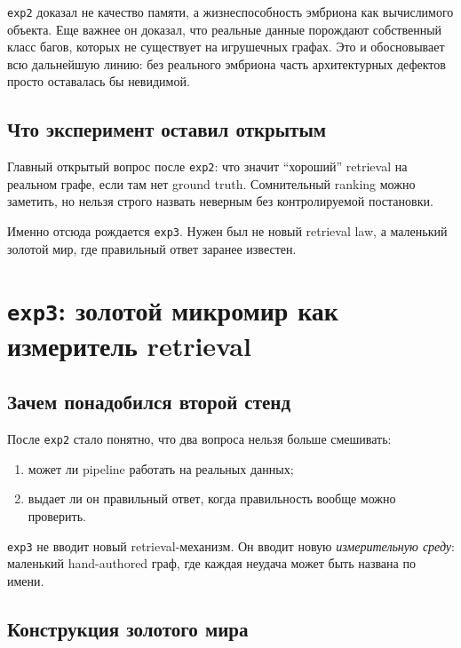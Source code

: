\begin{takeaway}
\texttt{exp2} доказал не качество памяти, а жизнеспособность эмбриона как
вычислимого объекта. Еще важнее он доказал, что реальные данные порождают
собственный класс багов, которых не существует на игрушечных графах. Это и
обосновывает всю дальнейшую линию: без реального эмбриона часть архитектурных
дефектов просто оставалась бы невидимой.
\end{takeaway}

\subsection{Что эксперимент оставил открытым}

Главный открытый вопрос после \texttt{exp2}: что значит ``хороший'' retrieval на
реальном графе, если там нет ground truth. Сомнительный ranking можно заметить,
но нельзя строго назвать неверным без контролируемой постановки.

Именно отсюда рождается \texttt{exp3}. Нужен был не новый retrieval law, а
маленький золотой мир, где правильный ответ заранее известен.

\section{\texttt{exp3}: золотой микромир как измеритель retrieval}

\subsection{Зачем понадобился второй стенд}

После \texttt{exp2} стало понятно, что два вопроса нельзя больше смешивать:

\begin{enumerate}[leftmargin=2em]
\item может ли pipeline работать на реальных данных;
\item выдает ли он правильный ответ, когда правильность вообще можно проверить.
\end{enumerate}

\texttt{exp3} не вводит новый retrieval-механизм. Он вводит новую
\emph{измерительную среду}: маленький hand-authored граф, где каждая неудача
может быть названа по имени.

\subsection{Конструкция золотого мира}


